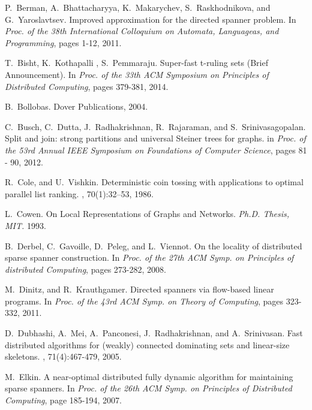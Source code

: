 \documentclass[11pt]{article}
\begin{document}
\begin{thebibliography}{10}
P.~Berman, A.~Bhattacharyya, K.~Makarychev, S.~Raskhodnikova, and G.~Yaroslavtsev.
\newblock Improved approximation for the directed spanner problem. 
\newblock In {\em Proc. of the 38th International Colloquium on Automata, Languageas, and Programming}, pages 1-12, 2011.

T.~Bisht, K.~Kothapalli , S.~Pemmaraju.
\newblock Super-fast t-ruling sets (Brief Announcement).
\newblock In {\em Proc. of the 33th ACM Symposium on Principles of Distributed Computing}, pages 379-381,  2014.

B.~Bollobas.
\newblock Dover Publications, 2004.


C.~Busch, C.~Dutta, J.~Radhakrishnan, R.~Rajaraman, and S.~Srinivasagopalan.
\newblock Split and join: strong partitions and universal Steiner trees for graphs.
\newblock in {\em Proc. of the 53rd Annual IEEE Symposium on Foundations of Computer Science}, pages 81 - 90, 2012. 




R.~Cole, and U.~Vishkin.
\newblock Deterministic coin tossing with applications to optimal parallel list ranking.
, 70(1):32--53, 1986.

L.~Cowen.
\newblock On Local Representations of Graphs and Networks. {\em Ph.D. Thesis, MIT.} 1993.







B.~Derbel, C.~Gavoille, D.~Peleg, and L.~Viennot.
\newblock On the locality of distributed sparse spanner construction.
\newblock In {\em Proc. of the 27th ACM Symp. on Principles of distributed Computing}, pages 273-282, 2008.

M.~Dinitz, and R.~Krauthgamer.
\newblock Directed spanners via flow-based linear programs.
\newblock In {\em Proc. of the 43rd ACM Symp. on Theory of Computing}, pages 323-332, 2011.


D.~Dubhashi, A.~Mei, A.~Panconesi, J.~Radhakrishnan, and A.~Srinivasan.
\newblock Fast distributed algorithms for (weakly) connected dominating sets and linear-size skeletons.
, 71(4):467-479, 2005.




M.~Elkin.
\newblock A near-optimal distributed fully dynamic algorithm for maintaining sparse spanners.
\newblock In {\em Proc. of the 26th ACM Symp. on Principles of Distributed Computing}, page 185-194, 2007.


\end{thebibliography}
\end{document}
